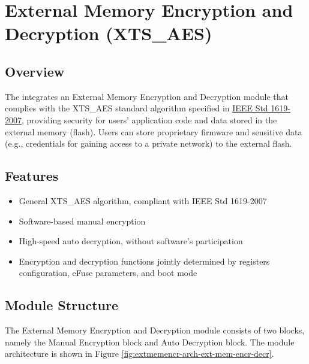 \documentclass[main\_\_EN.tex]{subfiles}
\begin{document}

\ifglobal
\else
    {\let\clearpage\relax \listoftodos}
    \tableofcontents
\fi




\chapter{External Memory Encryption and Decryption (XTS\_AES)}
\label{mod:extmemencr}
\hypertarget{extmemencr}{}

\section{Overview}

The \chipname{} integrates an External Memory Encryption and Decryption module that complies with the XTS\_AES standard algorithm specified in \href{https://ieeexplore.ieee.org/document/4493450}{IEEE Std 1619-2007}, providing security for users' application code and data stored in the external memory (flash). Users can store proprietary firmware and sensitive data (e.g., credentials for gaining access to a private network) to the external flash.

\section{Features}

\begin{itemize}
    \item General XTS\_AES algorithm, compliant with IEEE Std 1619-2007
    \item Software-based manual encryption
    \item High-speed auto decryption, without software's participation
    \item Encryption and decryption functions jointly determined by registers configuration, eFuse parameters, and boot mode
\end{itemize}


\section{Module Structure}
The External Memory Encryption and Decryption module consists of two blocks, namely the Manual Encryption block and Auto Decryption block. The module architecture is shown in Figure \ref{fig:extmemencr-arch-ext-mem-encr-decr}.
\end{document}

